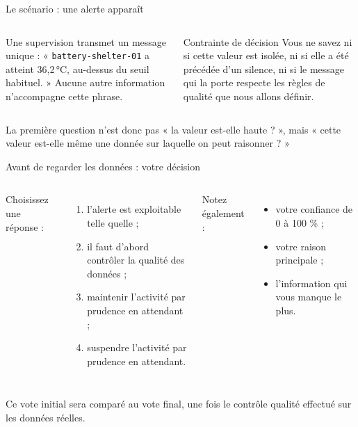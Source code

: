 \documentclass[aspectratio=169]{beamer}
\begin{document}
\begin{frame}{Le scénario : une alerte apparaît}
  \begin{columns}[T]
    Une supervision transmet un message unique : « \texttt{battery-shelter-01} a atteint 36,2\,°C, au-dessus du seuil habituel. » Aucune autre information n'accompagne cette phrase.
    \begin{block}{Contrainte de décision}
      Vous ne savez ni si cette valeur est isolée, ni si elle a été précédée d'un silence, ni si le message qui la porte respecte les règles de qualité que nous allons définir.
    \end{block}
  \end{columns}
  \vfill
  \alert{La première question n'est donc pas « la valeur est-elle haute ? », mais « cette valeur est-elle même une donnée sur laquelle on peut raisonner ? »}
\end{frame}

\begin{frame}{Avant de regarder les données : votre décision}
  \begin{columns}[T]
    Choisissez une réponse :
    \begin{enumerate}
      \item[A.] l'alerte est exploitable telle quelle ;
      \item[B.] il faut d'abord contrôler la qualité des données ;
      \item[C.] maintenir l'activité par prudence en attendant ;
      \item[D.] suspendre l'activité par prudence en attendant.
    \end{enumerate}
    Notez également :
    \begin{itemize}
      \item votre confiance de 0 à 100 \% ;
      \item votre raison principale ;
      \item l'information qui vous manque le plus.
    \end{itemize}
  \end{columns}
  \vfill
  \alert{Ce vote initial sera comparé au vote final, une fois le contrôle qualité effectué sur les données réelles.}
\end{frame}
\end{document}
